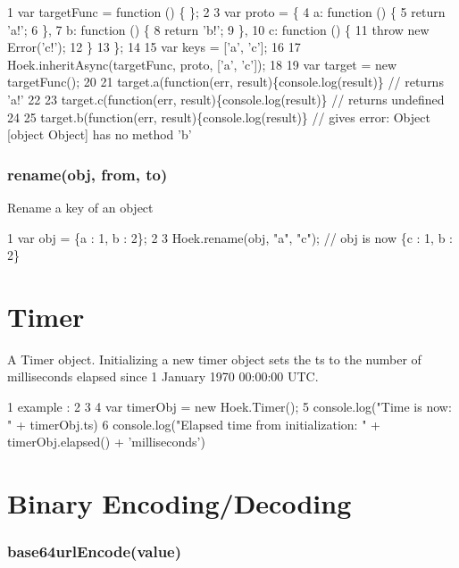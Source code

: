 \begin{DoxyCode}
1 var targetFunc = function () \{ \};
2 
3 var proto = \{
4                 a: function () \{
5                     return 'a!';
6                 \},
7                 b: function () \{
8                     return 'b!';
9                 \},
10                 c: function () \{
11                     throw new Error('c!');
12                 \}
13             \};
14 
15 var keys = ['a', 'c'];
16 
17 Hoek.inheritAsync(targetFunc, proto, ['a', 'c']);
18 
19 var target = new targetFunc();
20 
21 target.a(function(err, result)\{console.log(result)\}         // returns 'a!'       
22 
23 target.c(function(err, result)\{console.log(result)\}         // returns undefined
24 
25 target.b(function(err, result)\{console.log(result)\}         // gives error: Object [object Object] has no
       method 'b'
\end{DoxyCode}


\subsubsection*{rename(obj, from, to)}

Rename a key of an object


\begin{DoxyCode}
1 var obj = \{a : 1, b : 2\};
2 
3 Hoek.rename(obj, "a", "c");     // obj is now \{c : 1, b : 2\}
\end{DoxyCode}


\section*{Timer}

A Timer object. Initializing a new timer object sets the ts to the number of milliseconds elapsed since 1 January 1970 00\+:00\+:00 U\+T\+C.


\begin{DoxyCode}
1 example : 
2 
3 
4 var timerObj = new Hoek.Timer();
5 console.log("Time is now: " + timerObj.ts)
6 console.log("Elapsed time from initialization: " + timerObj.elapsed() + 'milliseconds')
\end{DoxyCode}


\section*{Binary Encoding/\+Decoding}

\subsubsection*{base64url\+Encode(value)}

